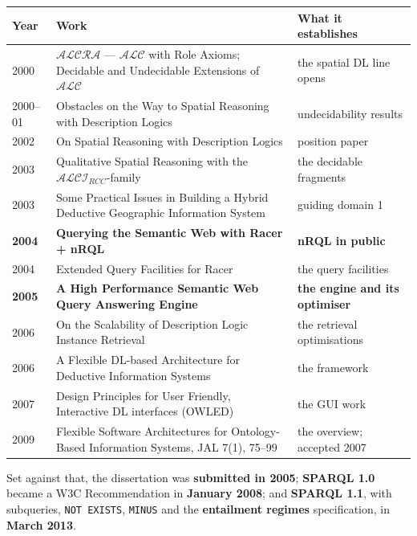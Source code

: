 \documentclass[11pt,a4paper,DIV=12,parskip=half]{scrartcl}
\begin{document}
\begin{center}
\small
\begin{tabular}{@{}l p{6.1cm} p{4.3cm}@{}}
\toprule
\textbf{Year} & \textbf{Work} & \textbf{What it establishes} \\
\midrule
2000 & $\mathcal{ALCRA}$ --- $\mathcal{ALC}$ with Role Axioms; Decidable and Undecidable Extensions of $\mathcal{ALC}$ & the spatial DL line opens \\[0.6ex]
2000--01 & Obstacles on the Way to Spatial Reasoning with Description Logics & undecidability results \\[0.6ex]
2002 & On Spatial Reasoning with Description Logics & position paper \\[0.6ex]
2003 & Qualitative Spatial Reasoning with the $\mathcal{ALCI}_{RCC}$-family & the decidable fragments \\[0.6ex]
2003 & Some Practical Issues in Building a Hybrid Deductive Geographic Information System & guiding domain 1 \\[0.6ex]
\textbf{2004} & \textbf{Querying the Semantic Web with Racer + nRQL} & \textbf{nRQL in public} \\[0.6ex]
2004 & Extended Query Facilities for Racer & the query facilities \\[0.6ex]
\textbf{2005} & \textbf{A High Performance Semantic Web Query Answering Engine} & \textbf{the engine and its optimiser} \\[0.6ex]
2006 & On the Scalability of Description Logic Instance Retrieval & the retrieval optimisations \\[0.6ex]
2006 & A Flexible DL-based Architecture for Deductive Information Systems & the framework \\[0.6ex]
2007 & Design Principles for User Friendly, Interactive DL interfaces (OWLED) & the GUI work \\[0.6ex]
2009 & Flexible Software Architectures for Ontology-Based Information Systems, JAL 7(1), 75--99 & the overview; accepted 2007 \\
\bottomrule
\end{tabular}
\end{center}

Set against that, the dissertation was \textbf{submitted in 2005};
\textbf{SPARQL 1.0} became a W3C Recommendation in \textbf{January 2008}; and
\textbf{SPARQL 1.1}, with subqueries, \texttt{NOT EXISTS}, \texttt{MINUS} and the
\textbf{entailment regimes} specification, in \textbf{March 2013}.
\end{document}
